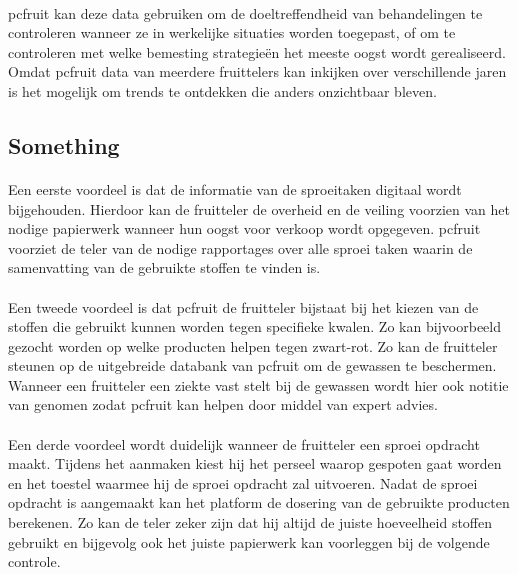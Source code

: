 \paragraph {} pcfruit  kan deze data gebruiken om de doeltreffendheid van behandelingen te
controleren wanneer ze in werkelijke situaties worden toegepast, of om te controleren met
welke bemesting strategie\"en het meeste oogst wordt gerealiseerd. Omdat pcfruit data van
meerdere fruittelers kan inkijken over verschillende jaren is het mogelijk om trends te
ontdekken die anders onzichtbaar bleven.

\paragraph {} 


\subsection {Something}


\paragraph {} Een eerste voordeel is dat de informatie van de sproeitaken digitaal wordt
bijgehouden. Hierdoor kan de fruitteler de overheid en de veiling voorzien van het
nodige papierwerk wanneer hun oogst voor verkoop wordt opgegeven. pcfruit voorziet de
teler van de nodige rapportages over alle sproei taken waarin de samenvatting van de
gebruikte stoffen te vinden is.

\paragraph {} Een tweede voordeel is dat pcfruit de fruitteler bijstaat bij het kiezen van de
stoffen die gebruikt kunnen worden tegen specifieke kwalen. Zo kan bijvoorbeeld gezocht
worden op welke producten helpen tegen zwart-rot. Zo kan de fruitteler steunen op de
uitgebreide databank van pcfruit om de gewassen te beschermen. Wanneer een fruitteler een
ziekte vast stelt bij de gewassen wordt hier ook notitie van genomen zodat pcfruit kan
helpen door middel van expert advies.

\paragraph {} Een derde voordeel wordt duidelijk wanneer de fruitteler een sproei opdracht
maakt. Tijdens het aanmaken kiest hij het perseel waarop gespoten gaat worden en het
toestel waarmee hij de sproei opdracht zal uitvoeren. Nadat de sproei opdracht is
aangemaakt kan het platform de dosering van de gebruikte producten berekenen. Zo kan de
teler zeker zijn dat hij altijd de juiste hoeveelheid stoffen gebruikt en bijgevolg ook
het juiste papierwerk kan voorleggen bij de volgende controle.


